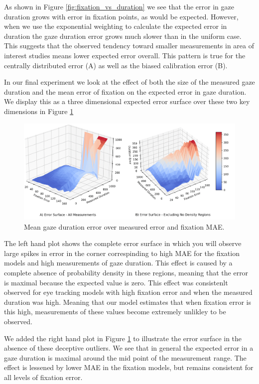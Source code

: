 \documentclass[12pt,a4paper]{article}
\numberwithin{equation}{section}
\begin{document}
As shown in Figure \ref{fig:fixation_vs_duration} we see that the error in gaze duration
grows with error in fixation points, as would be expected. However, when we use the exponential
weighting to calculate the expected error in duration the gaze duration error grows much slower
than in the uniform case. This suggests that the observed tendency toward smaller measurements
in area of interest studies means lower expected error overall. This pattern is true for the 
centrally distributed error (A) as well as the biased calibration error (B).

In our final experiment we look at the effect of both the size of the measured 
gaze duration and the mean error of fixation on the expected error in gaze duration.
We display this as a three dimensional expected error surface over these two key dimensions
in Figure \ref{fig:error_surface}

\begin{figure}[h!]
\centering
\includegraphics[scale=0.4]{../results/Error_surface.png}
\caption{Mean gaze duration error over measured error and fixation MAE.}
\label{fig:error_surface}
\end{figure}

The left hand plot shows the complete error surface in which you will observe large spikes in
error in the corner correspinding to high MAE for the fixation models and high measurements of
gaze duration. This effect is caused by a complete absence of probability density in these
regions, meaning that the error is maximal because the expected value is zero. This effect 
was consistenlt observed for 
eye tracking models with high fixation error and when the measured duration was high. Meaning
that our model estimates that when fixation error is this high, measurements of these values
become extremely unlikley to be observed.

We added the right hand plot in Figure \ref{fig:error_surface} to illustrate the error surface
in the absence of these deceptive outliers. We see that in general the expected error in a gaze
duration is maximal around the mid point of the measurement range. The effect is lessened by 
lower MAE in the fixation models, but remains consistent for all levels of fixation error.
\end{document}
